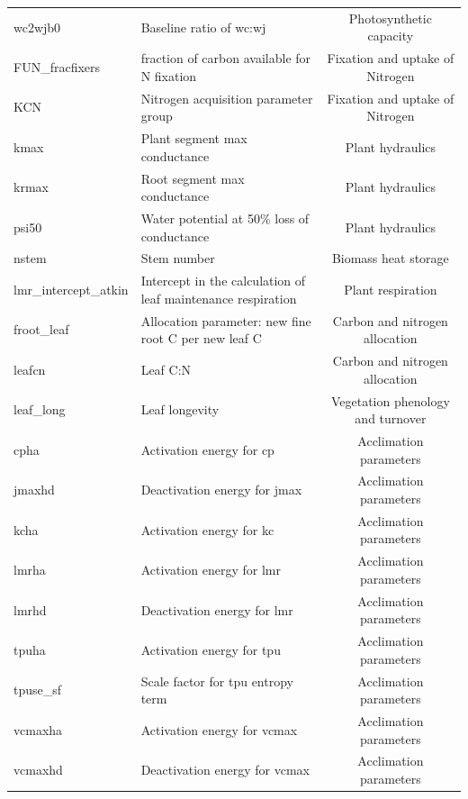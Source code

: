 \documentclass[draft]{agujournal2019}
\begin{document}
\begin{landscape}
\begin{table}[h]
\begin{tabular}{l l c}
wc2wjb0 & Baseline ratio of wc:wj & Photosynthetic capacity \\
FUN\_fracfixers & fraction of carbon available for N fixation & Fixation and uptake of Nitrogen \\
KCN & Nitrogen acquisition parameter group & Fixation and uptake of Nitrogen \\
kmax & Plant segment max conductance & Plant hydraulics \\
krmax & Root segment max conductance & Plant hydraulics \\
psi50 & Water potential at 50\% loss of conductance & Plant hydraulics \\
nstem & Stem number & Biomass heat storage \\
lmr\_intercept\_atkin & Intercept in the calculation of leaf maintenance respiration& Plant respiration \\
froot\_leaf & Allocation parameter: new fine root C per new leaf C & Carbon and nitrogen allocation \\
leafcn & Leaf C:N & Carbon and nitrogen allocation \\
leaf\_long & Leaf longevity & Vegetation phenology and turnover \\
cpha & Activation energy for cp & Acclimation parameters \\
jmaxhd & Deactivation energy for jmax & Acclimation parameters \\
kcha & Activation energy for kc & Acclimation parameters \\
lmrha & Activation energy for lmr & Acclimation parameters \\
lmrhd & Deactivation energy for lmr & Acclimation parameters \\
tpuha & Activation energy for tpu & Acclimation parameters \\
tpuse\_sf & Scale factor for tpu entropy term & Acclimation parameters \\
vcmaxha & Activation energy for vcmax & Acclimation parameters \\
vcmaxhd & Deactivation energy for vcmax & Acclimation parameters \\
 \hline
 \end{tabular}
 \end{table}
\end{landscape}
\end{document}
